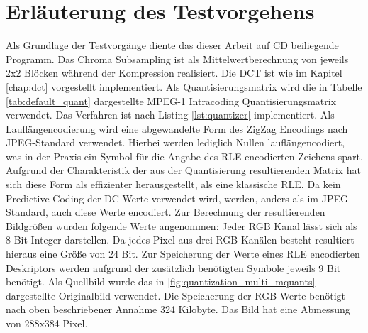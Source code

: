 \chapter{Erläuterung des Testvorgehens}
\label{chap:testvorgenen}

Als Grundlage der Testvorgänge diente das dieser Arbeit auf CD beiliegende Programm. Das Chroma Subsampling ist als Mittelwertberechnung von jeweils 2x2 Blöcken während der Kompression realisiert. Die DCT ist wie im Kapitel \ref{chap:dct} vorgestellt implementiert. Als Quantisierungsmatrix wird die in Tabelle \ref{tab:default_quant} dargestellte MPEG-1 Intracoding Quantisierungsmatrix verwendet. Das Verfahren ist nach Listing \ref{lst:quantizer} implementiert. Als Lauflängencodierung wird eine abgewandelte Form des ZigZag Encodings nach JPEG-Standard verwendet. Hierbei werden lediglich Nullen lauflängencodiert, was in der Praxis ein Symbol für die Angabe des RLE encodierten Zeichens spart. Aufgrund der Charakteristik der aus der Quantisierung resultierenden Matrix hat sich diese Form als effizienter herausgestellt, als eine klassische RLE. Da kein Predictive Coding der DC-Werte verwendet wird, werden, anders als im JPEG Standard, auch diese Werte encodiert. Zur Berechnung der resultierenden Bildgrößen wurden folgende Werte angenommen: Jeder RGB Kanal lässt sich als 8 Bit Integer darstellen. Da jedes Pixel aus drei RGB Kanälen besteht resultiert hieraus eine Größe von 24 Bit. Zur Speicherung der Werte eines RLE encodierten Deskriptors werden aufgrund der zusätzlich benötigten Symbole jeweils 9 Bit benötigt. Als Quellbild wurde das in \ref{fig:quantization_multi_mquants} dargestellte Originalbild verwendet. Die Speicherung der RGB Werte benötigt nach oben beschriebener Annahme 324 Kilobyte. Das Bild hat eine Abmessung von 288x384 Pixel.
